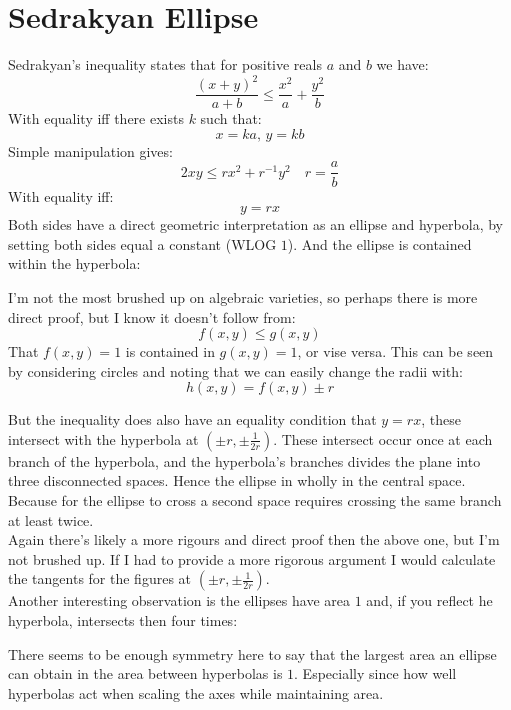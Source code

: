 
\section{Sedrakyan Ellipse}
Sedrakyan's inequality states that for positive reals $a$ and $b$ we have:
\[\frac{(x+y)^2}{a+b} \leq \frac{x^2}{a}+\frac{y^2}{b}\]
With equality iff there exists $k$ such that:
\[x=ka,\,y=kb\]
Simple manipulation gives:
\[2xy \leq rx^2+r^{-1}y^2\quad r = \frac{a}{b}\]
With equality iff:
\[y=rx\]
Both sides have a direct geometric interpretation as an ellipse and hyperbola,
by setting both sides equal a constant (WLOG $1$).
And the ellipse is contained within the hyperbola:
\begin{center}
\end{center}
I'm not the most brushed up on algebraic varieties, 
so perhaps there is more direct proof,
but I know it doesn't follow from:
\[f(x,y)\leq g(x,y)\]
That $f(x,y)=1$ is contained in $g(x,y)=1$, 
or vise versa.
This can be seen by considering circles and noting that we can easily change the radii with:
\[h(x,y)=f(x,y)\pm r\]

But the inequality does also have an equality condition that $y=rx$,
these intersect with the hyperbola at $(\pm r,\pm\frac{1}{2r})$.
These intersect occur once at each branch of the hyperbola,
and the hyperbola's branches divides the plane into three disconnected spaces.
Hence the ellipse in wholly in the central space.
Because for the ellipse to cross a second space requires crossing the same branch at least twice.
\\

Again there's likely a more rigours and direct proof then the above one,
but I'm not brushed up.
If I had to provide a more rigorous argument I would calculate the tangents for the figures at $(\pm r,\pm\frac{1}{2r})$.
\\

Another interesting observation is the ellipses have area $1$ and,
if you reflect he hyperbola,
intersects then four times:
\begin{center}
\end{center}
There seems to be enough symmetry here to say that the largest area an ellipse can obtain in the area between hyperbolas is $1$.
Especially since how well hyperbolas act when scaling the axes while maintaining area.
